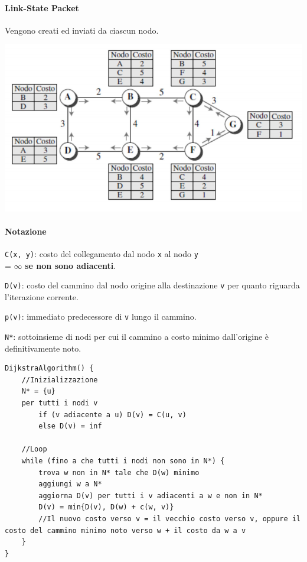 \documentclass[10pt]{article}
\begin{document}
\paragraph{Link-State Packet} Vengono creati ed inviati da ciascun nodo.
\begin{center}
	\includegraphics[scale=0.7]{linkstatepacket.png}
\end{center}
\paragraph{Notazione}
\begin{list}{}{}
	\item \texttt{C(x, y)}: costo del collegamento dal nodo \texttt{x} al nodo \texttt{y}\\
	= $\infty$ \textbf{se non sono adiacenti}.
	\item \texttt{D(v)}: costo del cammino dal nodo origine alla destinazione \texttt{v} per quanto riguarda l'iterazione corrente.
	\item \texttt{p(v)}: immediato predecessore di \texttt{v} lungo il cammino.
	\item \texttt{N*}: sottoinsieme di nodi per cui il cammino a costo minimo dall'origine è definitivamente noto.
\end{list}
\pagebreak
\begin{lstlisting}
DijkstraAlgorithm() {
	//Inizializzazione
	N* = {u}
	per tutti i nodi v
		if (v adiacente a u) D(v) = C(u, v)
		else D(v) = inf
	
	//Loop
	while (fino a che tutti i nodi non sono in N*) {
		trova w non in N* tale che D(w) minimo
		aggiungi w a N*
		aggiorna D(v) per tutti i v adiacenti a w e non in N*
		D(v) = min{D(v), D(w) + c(w, v)}
		//Il nuovo costo verso v = il vecchio costo verso v, oppure il costo del cammino minimo noto verso w + il costo da w a v
	}
}
\end{lstlisting}
\end{document}
